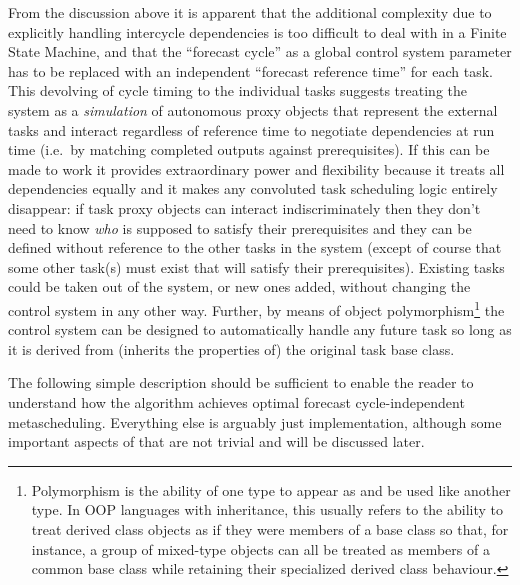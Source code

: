 \documentclass[11pt,a4paper]{article}
\begin{document}
From the discussion above it is apparent that the additional complexity
due to explicitly handling intercycle dependencies is too difficult to
deal with in a Finite State Machine, and that the ``forecast cycle'' as
a global control system parameter has to be replaced with an independent
``forecast reference time'' for each task. This devolving of cycle
timing to the individual tasks suggests treating the system as a {\em
simulation} of autonomous proxy objects that represent the external
tasks and interact regardless of reference time to negotiate
dependencies at run time (i.e.\ by matching completed outputs against
prerequisites). If this can be made to work it provides extraordinary
power and flexibility because it treats all dependencies equally and it
makes any convoluted task scheduling logic entirely disappear: if task
proxy objects can interact indiscriminately then they don't need to know
{\em who} is supposed to satisfy their prerequisites and they can be
defined without reference to the other tasks in the system (except of
course that some other task(s) must exist that will satisfy their
prerequisites).  Existing tasks could be taken out of the system, or new
ones added, without changing the control system in any other way.
Further, by means of object polymorphism\footnote{Polymorphism is the
ability of one type to appear as and be used like another type. In OOP
languages with inheritance, this usually refers to the ability to treat
derived class objects as if they were members of a base class so that,
for instance, a group of mixed-type objects can all be treated as
members of a common base class while retaining their specialized derived
class behaviour.} the control system can be designed to automatically
handle any future task so long as it is derived from (inherits the
properties of) the original task base class.

The following simple description should be sufficient to enable the
reader to understand how the algorithm achieves optimal forecast
cycle-independent metascheduling. Everything else is arguably just
implementation, although some important aspects of that are not trivial
and will be discussed later.
\end{document}
